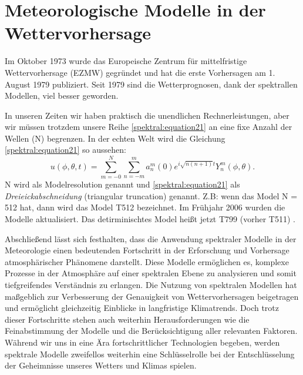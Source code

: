 %
%
%
%
\section{Meteorologische Modelle in der Wettervorhersage
\label{spektral:section:modelle}}

Im Oktober 1973 wurde das Europeische Zentrum für mittelfristige Wettervorhersage (EZMW) gegründet \cite{spektral:ezmw} und hat die erste Vorhersagen am 1. August 1979 publiziert.
Seit 1979 sind die Wetterprognosen, dank der spektrallen Modellen, viel besser geworden.

In unseren Zeiten wir haben praktisch die unendlichen Rechnerleistungen, aber wir müssen trotzdem unsere Reihe \eqref{spektral:equation21} an eine fixe Anzahl der Wellen (N) begrenzen.
In der echten Welt wird die Gleichung \eqref{spektral:equation21} so aussehen:
\begin{equation}
u(\phi, \theta, t) = \sum_{m=-0}^{N}\sum_{n=-m}^{m}a_n^m(0)e^{i\sqrt{n(n+1)}t}Y_n^m(\phi, \theta).
\label{spektral:equation22}
\end{equation}
N wird als Modelresolution genannt \cite[Seite 223]{spektral:NumericalWeatherPrediction} und \eqref{spektral:equation21} als \textit{Dreieickabschneidung} (triangular truncation) genannt.
Z.B: wenn das Model N = 512 hat, dann wird das Model T512 bezeichnet. 
Im Frühjahr 2006 wurden die Modelle aktualisiert. Das detirminischtes Model heißt jetzt T799 (vorher T511) \cite[Seite 222]{spektral:NumericalWeatherPrediction}.

Abschließend lässt sich festhalten, dass die Anwendung spektraler Modelle in der Meteorologie einen bedeutenden Fortschritt in der Erforschung und Vorhersage atmosphärischer Phänomene darstellt.
Diese Modelle ermöglichen es, komplexe Prozesse in der Atmosphäre auf einer spektralen Ebene zu analysieren und somit tiefgreifendes Verständnis zu erlangen.
Die Nutzung von spektralen Modellen hat maßgeblich zur Verbesserung der Genauigkeit von Wettervorhersagen beigetragen und ermöglicht gleichzeitig Einblicke in langfristige Klimatrends.
Doch trotz dieser Fortschritte stehen auch weiterhin Herausforderungen wie die Feinabstimmung der Modelle und die Berücksichtigung aller relevanten Faktoren.
Während wir uns in eine Ära fortschrittlicher Technologien begeben, werden spektrale Modelle zweifellos weiterhin eine Schlüsselrolle bei der Entschlüsselung der Geheimnisse unseres Wetters und Klimas spielen.
